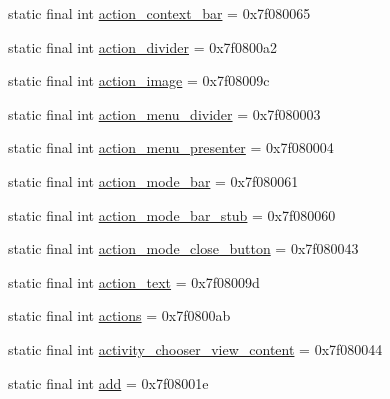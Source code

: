 \begin{CompactItemize}
\item 
static final int \hyperlink{classandroid_1_1support_1_1graphics_1_1drawable_1_1animated_1_1_r_1_1id_f6569d748a2236af8940114807e10f73}{action\_\-context\_\-bar} = 0x7f080065
\item 
static final int \hyperlink{classandroid_1_1support_1_1graphics_1_1drawable_1_1animated_1_1_r_1_1id_540f75f7fc36d6e9437321563226657c}{action\_\-divider} = 0x7f0800a2
\item 
static final int \hyperlink{classandroid_1_1support_1_1graphics_1_1drawable_1_1animated_1_1_r_1_1id_65b7e2d9d6aad4736e62865bba10158b}{action\_\-image} = 0x7f08009c
\item 
static final int \hyperlink{classandroid_1_1support_1_1graphics_1_1drawable_1_1animated_1_1_r_1_1id_4a3f9f08e8315f6f0c000366af32884d}{action\_\-menu\_\-divider} = 0x7f080003
\item 
static final int \hyperlink{classandroid_1_1support_1_1graphics_1_1drawable_1_1animated_1_1_r_1_1id_d8ea73e10a242eb683c514824b97aaee}{action\_\-menu\_\-presenter} = 0x7f080004
\item 
static final int \hyperlink{classandroid_1_1support_1_1graphics_1_1drawable_1_1animated_1_1_r_1_1id_6d456d46ac7377e7d31d058bb6894fdb}{action\_\-mode\_\-bar} = 0x7f080061
\item 
static final int \hyperlink{classandroid_1_1support_1_1graphics_1_1drawable_1_1animated_1_1_r_1_1id_af930138b1254b10d76d99b680ad3cd3}{action\_\-mode\_\-bar\_\-stub} = 0x7f080060
\item 
static final int \hyperlink{classandroid_1_1support_1_1graphics_1_1drawable_1_1animated_1_1_r_1_1id_e26155aa6127c15ef66a660616b4443a}{action\_\-mode\_\-close\_\-button} = 0x7f080043
\item 
static final int \hyperlink{classandroid_1_1support_1_1graphics_1_1drawable_1_1animated_1_1_r_1_1id_af4ed3c42714c936a76a6e436324330c}{action\_\-text} = 0x7f08009d
\item 
static final int \hyperlink{classandroid_1_1support_1_1graphics_1_1drawable_1_1animated_1_1_r_1_1id_d95f30cc6ab261960414072a50eb8df1}{actions} = 0x7f0800ab
\item 
static final int \hyperlink{classandroid_1_1support_1_1graphics_1_1drawable_1_1animated_1_1_r_1_1id_b26a6ea3117ccb2fafc0329523314cdb}{activity\_\-chooser\_\-view\_\-content} = 0x7f080044
\item 
static final int \hyperlink{classandroid_1_1support_1_1graphics_1_1drawable_1_1animated_1_1_r_1_1id_26bc6896c32f8f3b8766a1ded1d4c771}{add} = 0x7f08001e

\end{CompactItemize}
